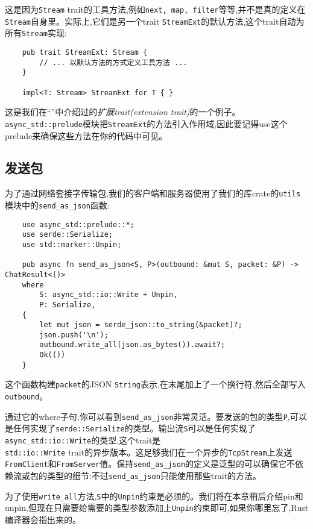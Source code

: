 这是因为\texttt{Stream} trait的工具方法,例如\texttt{next, map, filter}等等,并不是真的定义在\texttt{Stream}自身里。实际上,它们是另一个trait \texttt{StreamExt}的默认方法,这个trait自动为所有\texttt{Stream}实现:
\begin{verbatim}
    pub trait StreamExt: Stream {
        // ... 以默认方法的方式定义工具方法 ...
    }

    impl<T: Stream> StreamExt for T { }
\end{verbatim}

这是我们在“”中介绍过的\emph{扩展trait(extension trait)}的一个例子。\texttt{async\_std::prelude}模块把\texttt{StreamExt}的方法引入作用域,因此要记得use这个prelude来确保这些方法在你的代码中可见。

\subsection{发送包}
为了通过网络套接字传输包,我们的客户端和服务器使用了我们的库crate的\texttt{utils}模块中的\texttt{send\_as\_json}函数:
\begin{verbatim}
    use async_std::prelude::*;
    use serde::Serialize;
    use std::marker::Unpin;

    pub async fn send_as_json<S, P>(outbound: &mut S, packet: &P) -> ChatResult<()>
    where
        S: async_std::io::Write + Unpin,
        P: Serialize,
    {
        let mut json = serde_json::to_string(&packet)?;
        json.push('\n');
        outbound.write_all(json.as_bytes()).await?;
        Ok(())
    }
\end{verbatim}

这个函数构建\texttt{packet}的JSON \texttt{String}表示,在末尾加上了一个换行符,然后全部写入\texttt{outbound}。

通过它的where子句,你可以看到\texttt{send\_as\_json}非常灵活。要发送的包的类型\texttt{P},可以是任何实现了\texttt{serde::Serialize}的类型。输出流\texttt{S}可以是任何实现了\texttt{async\_std::io::Write}的类型,这个trait是\\
\texttt{std::io::Write} trait的异步版本。这足够我们在一个异步的\texttt{TcpStream}上发送\texttt{FromClient}和\texttt{FromServer}值。保持\texttt{send\_as\_json}的定义是泛型的可以确保它不依赖流或包的类型的细节:不过\texttt{send\_as\_json}只能使用那些trait的方法。

为了使用\texttt{write\_all}方法,\texttt{S}中的\texttt{Unpin}约束是必须的。我们将在本章稍后介绍pin和unpin,但现在只需要给需要的类型参数添加上\texttt{Unpin}约束即可,如果你哪里忘了,Rust编译器会指出来的。

